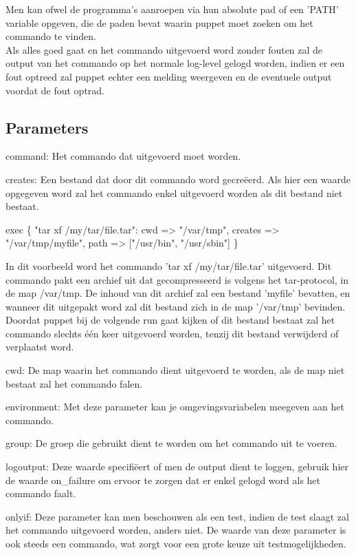 	Men kan ofwel de programma's aanroepen via hun absolute pad of een 'PATH' variable opgeven, die de paden bevat waarin puppet moet zoeken om het commando te vinden.\\
	Als alles goed gaat en het commando uitgevoerd word zonder fouten zal de output van het commando op het normale log-level gelogd worden, indien er een fout optreed zal puppet echter een melding weergeven en de eventuele output voordat de fout optrad.\\


\subsection{Parameters}
		command:
		Het commando dat uitgevoerd moet worden.

		creates:
		Een bestand dat door dit commando word gecre\"{e}erd.
		Als hier een waarde opgegeven word zal het commando enkel uitgevoerd worden als dit bestand niet bestaat.

			exec \{ "tar xf /my/tar/file.tar":
				cwd => "/var/tmp",
				creates => "/var/tmp/myfile",
				path => ["/usr/bin", "/usr/sbin"]
			\}

		In dit voorbeeld word het commando 'tar xf /my/tar/file.tar' uitgevoerd.
		Dit commando pakt een archief uit dat gecompresseerd is volgens het tar-protocol, in de map /var/tmp.
		De inhoud van dit archief zal een bestand 'myfile' bevatten, en wanneer dit uitgepakt word zal dit bestand zich in de map '/var/tmp' bevinden.
		Doordat puppet bij de volgende run gaat kijken of dit bestand bestaat zal het commando slechts één keer uitgevoerd worden, tenzij dit bestand verwijderd of verplaatst word.

		cwd:
		De map waarin het commando dient uitgevoerd te worden, als de map niet bestaat zal het commando falen.

		environment:
		Met deze parameter kan je omgevingsvariabelen meegeven aan het commando.

		group:
		De groep die gebruikt dient te worden om het commando uit te voeren.

		logoutput:
		Deze waarde specifi\"{e}ert of men de output dient te loggen, gebruik hier de waarde on\_failure om ervoor te zorgen dat er enkel gelogd word als het commando faalt.

		onlyif:
		Deze parameter kan men beschouwen als een test, indien de test slaagt zal het commando uitgevoerd worden, anders niet.
		De waarde van deze parameter is ook steeds een commando, wat zorgt voor een grote keuze uit testmogelijkheden.

